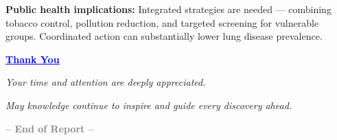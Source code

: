 \documentclass[a4paper,12pt]{article}
\begin{document}
\vspace{0.5cm}

\textbf{Public health implications:} Integrated strategies are needed — combining tobacco control, pollution reduction, and targeted screening for vulnerable groups. Coordinated action can substantially lower lung disease prevalence.

\vspace{2em}
\begin{center}
	\textbf{\LARGE{\textcolor{blue}{\underline{Thank You}}}} \
	
	\vspace{0.4em}
	\textit{\large{Your time and attention are deeply appreciated.}} \
	

	\textit{\large{May knowledge continue to inspire and guide every discovery ahead.}} \
	

	\textbf{\textcolor{gray}{-- End of Report --}}
\end{center}
\end{document}
